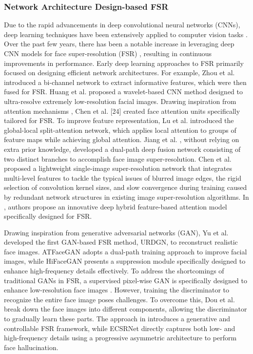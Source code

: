 \subsubsection{Network Architecture Design-based FSR}
Due to the rapid advancements in deep convolutional neural networks (CNNs), deep learning techniques have been extensively applied to computer vision tasks \cite{fsr1,fsr2,fsr3,fsr4}. Over the past few years, there has been a notable increase in leveraging deep CNN models for face super-resolution (FSR) \cite{fsr5}, resulting in continuous improvements in performance. Early deep learning approaches to FSR primarily focused on designing efficient network architectures. For example, Zhou et al. \cite{fsr6} introduced a bi-channel network to extract informative features, which were then fused for FSR. Huang et al. \cite{fsr8} proposed a wavelet-based CNN method designed to ultra-resolve extremely low-resolution facial images. Drawing inspiration from attention mechanisms \cite{fsr9,fsr10}, Chen et al. [24] created face attention units specifically tailored for FSR. To improve feature representation, Lu et al. \cite{fsr11} introduced the global-local split-attention network, which applies local attention to groups of feature maps while achieving global attention. Jiang et al. \cite{fsr12}, without relying on extra prior knowledge, developed a dual-path deep fusion network consisting of two distinct branches to accomplish face image super-resolution. Chen et al. \cite{fsr13} proposed a lightweight single-image super-resolution network that integrates multi-level features to tackle the typical issues of blurred image edges, the rigid selection of convolution kernel sizes, and slow convergence during training caused by redundant network structures in existing image super-resolution algorithms. In \cite{fsr14}, authors propose an innovative deep hybrid feature-based attention model specifically designed for FSR.

Drawing inspiration from generative adversarial networks (GAN), Yu et al. \cite{fsr7} developed the first GAN-based FSR method, URDGN, to reconstruct realistic face images. ATFaceGAN \cite{fsr15} adopts a dual-path training approach to improve facial images, while HiFaceGAN \cite{fsr16} presents a suppression module specifically designed to enhance high-frequency details effectively. To address the shortcomings of traditional GANs in FSR, a supervised pixel-wise GAN is specifically designed to enhance low-resolution face images \cite{fsr17}. However, training the discriminator to recognize the entire face image poses challenges. To overcome this, Dou et al. \cite{fsr18} break down the face images into different components, allowing the discriminator to gradually learn these parts. The approach in \cite{fsr19} introduces a generative and controllable FSR framework, while ECSRNet \cite{fsr20} directly captures both low- and high-frequency details using a progressive asymmetric architecture to perform face hallucination. 
